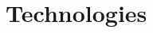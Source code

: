 \documentclass[10pt, letterpaper]{article}
\newenvironment{highlights}{
    \begin{itemize}[
        topsep=0.10 cm,
        parsep=0.10 cm,
        partopsep=0pt,
        itemsep=0pt,
        leftmargin=0.4 cm + 10pt
    ]
}{
    \end{itemize}
} %
\newenvironment{twocolentry}[2][]{
    \onecolentry
    \def\secondColumn{#2}
    \setcolumnwidth{\fill, 4.5 cm}
    \begin{paracol}{2}
}{
    \switchcolumn \raggedleft \secondColumn
    \end{paracol}
    \endonecolentry
} %
\let\hrefWithoutArrow\href
\renewcommand{\href}[2]{\hrefWithoutArrow{#1}{\ifthenelse{\equal{#2}{}}{ }{#2 }\raisebox{.15ex}{\footnotesize \faExternalLink*}}}
\begin{document}
\vspace{-0.4cm}








 \vspace{0.1 cm}
    \section{Technologies}
\end{document}
